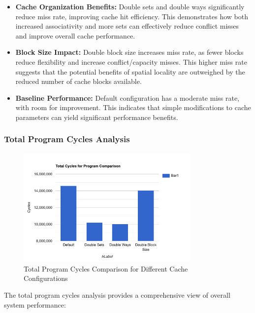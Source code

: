 \documentclass[10pt]{article}
\begin{document}
\begin{itemize}
    \item \textbf{Cache Organization Benefits:} Double sets and double ways significantly reduce miss rate, improving cache hit efficiency. This demonstrates how both increased associativity and more sets can effectively reduce conflict misses and improve overall cache performance.
    
    \item \textbf{Block Size Impact:} Double block size increases miss rate, as fewer blocks reduce flexibility and increase conflict/capacity misses. This higher miss rate suggests that the potential benefits of spatial locality are outweighed by the reduced number of cache blocks available.
    
    \item \textbf{Baseline Performance:} Default configuration has a moderate miss rate, with room for improvement. This indicates that simple modifications to cache parameters can yield significant performance benefits.
\end{itemize}

\subsubsection{Total Program Cycles Analysis}
\begin{figure}[H]
    \centering
    \includegraphics[width=0.8\textwidth]{./images/total_cycles.png}
    \caption{Total Program Cycles Comparison for Different Cache Configurations}
\end{figure}

The total program cycles analysis provides a comprehensive view of overall system performance:
\end{document}
